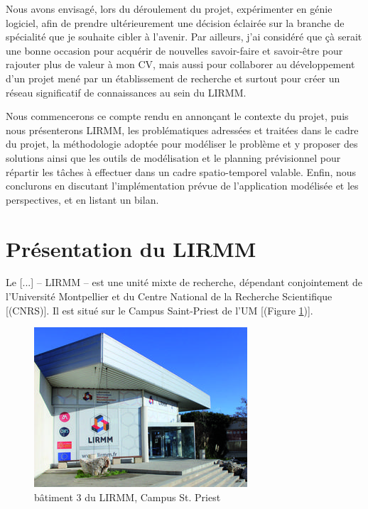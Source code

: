 \documentclass[a4paper,12pt]{book}
\theoremstyle{break}
\theoremstyle{break}
\theoremstyle{definition}
\theoremstyle{remark}
\begin{document}
Nous avons envisagé, lors du déroulement du projet, expérimenter en génie logiciel, afin de prendre ultérieurement une décision éclairée sur la branche de spécialité que je souhaite cibler à l'avenir. Par ailleurs, j’ai considéré que çà serait une bonne occasion pour acquérir de nouvelles savoir-faire et savoir-être pour rajouter plus de valeur à mon CV, mais aussi pour collaborer au développement d'un projet mené par un établissement de recherche et surtout pour créer un réseau significatif de connaissances au sein du LIRMM.

Nous commencerons ce compte rendu en annonçant le contexte du projet, puis nous présenterons LIRMM, les problématiques adressées et traitées dans le cadre du projet, la méthodologie adoptée pour modéliser le problème et y proposer des solutions ainsi que les outils de modélisation et le planning prévisionnel pour répartir les tâches à effectuer dans un cadre spatio-temporel valable. Enfin, nous conclurons en discutant l'implémentation prévue de l'application modélisée et les perspectives, et en listant un bilan.

\section{Présentation du LIRMM}
\og Le [...] – LIRMM – est une unité mixte de recherche, dépendant conjointement de l'Université Montpellier et du Centre National de la Recherche Scientifique [(CNRS)]. Il est situé sur le Campus Saint-Priest de l'UM [(Figure \ref{fig:lirmmPhoto})].

\begin{figure}[!ht]
  \centering
  \includegraphics[scale=0.9]{images/lirmmPhoto.jpg}
  \caption{bâtiment 3 du LIRMM, Campus St. Priest}
  \label{fig:lirmmPhoto}
\end{figure}
\end{document}
